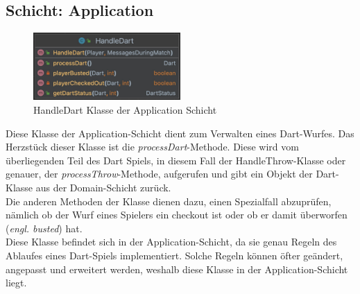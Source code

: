 \subsection{Schicht: Application}
\begin{figure}[ht]
    \includegraphics[width=0.5\textwidth]{Bilder/HandleDart.png}
    \caption{HandleDart Klasse der Application Schicht}
    \label{fig:handle-dart-uml}
\end{figure}
Diese Klasse der Application-Schicht dient zum Verwalten eines Dart-Wurfes. Das Herzstück dieser Klasse ist die \textit{processDart}-Methode. Diese wird vom überliegenden Teil des Dart Spiels, in diesem Fall der HandleThrow-Klasse oder genauer, der \textit{processThrow}-Methode, aufgerufen und gibt ein Objekt der Dart-Klasse aus der Domain-Schicht zurück.\\
Die anderen Methoden der Klasse dienen dazu, einen Spezialfall abzuprüfen, nämlich ob der Wurf eines Spielers ein checkout ist oder ob er damit überworfen (\textit{engl. busted}) hat.\\
Diese Klasse befindet sich in der Application-Schicht, da sie genau Regeln des Ablaufes eines Dart-Spiels implementiert. Solche Regeln können öfter geändert, angepasst und erweitert werden, weshalb diese Klasse in der Application-Schicht liegt.